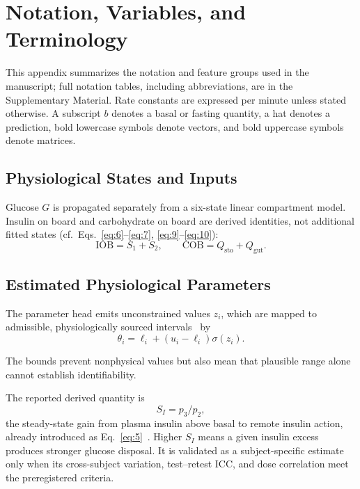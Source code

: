 \documentclass[journal]{IEEEtran}
\begin{document}
\appendices
\section{Notation, Variables, and Terminology}

This appendix summarizes the notation and feature groups used in the manuscript; full notation tables, including abbreviations, are in the Supplementary Material. Rate constants are expressed per minute unless stated otherwise. A subscript $b$ denotes a basal or fasting quantity, a hat denotes a prediction, bold lowercase symbols denote vectors, and bold uppercase symbols denote matrices.

\subsection{Physiological States and Inputs}

Glucose $G$ is propagated separately from a six-state linear compartment model. Insulin on board and carbohydrate on board are derived identities, not additional fitted states (cf.\ Eqs.~\eqref{eq:6}--\eqref{eq:7}, \eqref{eq:9}--\eqref{eq:10}):
\begin{equation}
\text{IOB} = S_1 + S_2, \qquad \text{COB} = Q_{\text{sto}} + Q_{\text{gut}}.
\label{eq:19}
\end{equation}

\subsection{Estimated Physiological Parameters}

The parameter head emits unconstrained values $z_i$, which are mapped to admissible, physiologically sourced intervals~\cite{ref33} by
\begin{equation}
\theta_i = \ell_i + (u_i - \ell_i)\sigma(z_i).
\label{eq:20}
\end{equation}

The bounds prevent nonphysical values but also mean that plausible range alone cannot establish identifiability.

The reported derived quantity is
\begin{equation}
S_I = p_3/p_2,
\label{eq:21}
\end{equation}
the steady-state gain from plasma insulin above basal to remote insulin action, already introduced as Eq.~\eqref{eq:5}~\cite{ref1,ref32}. Higher $S_I$ means a given insulin excess produces stronger glucose disposal. It is validated as a subject-specific estimate only when its cross-subject variation, test--retest ICC, and dose correlation meet the preregistered criteria.
\end{document}
